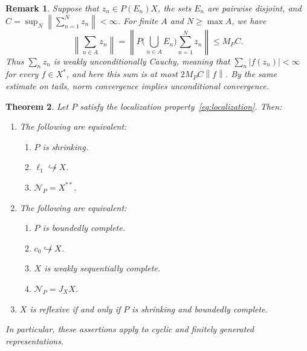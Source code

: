 \documentclass[11pt,leqno]{amsart}
\theoremstyle{compact}
\numberwithin{equation}{section}
\newtheorem{theorem}{Theorem}[section]
\theoremstyle{compactremark}
\newtheorem{remark}[theorem]{Remark}
\theoremstyle{compact}
\newcommand{\1}{\mathbbm{1}}
\newcommand{\norm}[1]{\left\|#1\right\|}
\newcommand{\abs}[1]{\left|#1\right|}
\begin{document}
\begin{remark}\label{rem:finite-subsums}
Suppose that $z_n\in P(E_n)X$, the sets $E_n$ are pairwise disjoint, and $C=\sup_N\norm{\sum_{n=1}^Nz_n}<\infty$. For finite $A$ and $N\geq\max A$, we have
\[
\norm{\sum_{n\in A}z_n}
=\norm{P\Big(\bigcup_{n\in A}E_n\Big)\sum_{n=1}^Nz_n}\leq M_PC.
\]
Thus $\sum_nz_n$ is \emph{weakly unconditionally Cauchy}, meaning that $\sum_n\abs{f(z_n)}<\infty$ for every $f\in X^*$, and here this sum is at most $2M_PC\norm{f}$. By the same estimate on tails, norm convergence implies unconditional convergence.
\end{remark}

\begin{theorem}\label{thm:representation-james}
Let $P$ satisfy the localization property~\eqref{eq:localization}. Then:
\begin{enumerate}
\item The following are equivalent:
    \begin{enumerate}[label=(\roman*),ref=\theenumi(\roman*),leftmargin=2em,itemsep=0pt,parsep=0pt,topsep=3pt,partopsep=0pt,beginpenalty=10000,midpenalty=10000]
\item\label{item:james-shrinking} $P$ is shrinking.
\item\label{item:james-no-l1} $\ell_1\not\hookrightarrow X$.
\item\label{item:james-normal-full} $\mathcal N_P=X^{**}$.
    \end{enumerate}
\item The following are equivalent:
    \begin{enumerate}[label=(\roman*),ref=\theenumi(\roman*),leftmargin=2em,itemsep=0pt,parsep=0pt,topsep=3pt,partopsep=0pt,beginpenalty=10000,midpenalty=10000]
\item $P$ is boundedly complete.
\item $c_0\not\hookrightarrow X$.
\item $X$ is weakly sequentially complete.
\item $\mathcal N_P=J_XX$.
    \end{enumerate}
\item $X$ is reflexive if and only if $P$ is shrinking and boundedly complete.
\end{enumerate}
In particular, these assertions apply to cyclic and finitely generated representations.
\end{theorem}
\end{document}
